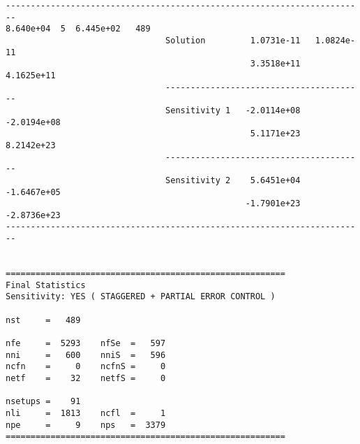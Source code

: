 \begin{verbatim}
------------------------------------------------------------------------
8.640e+04  5  6.445e+02   489
                                Solution         1.0731e-11   1.0824e-11 
                                                 3.3518e+11   4.1625e+11 
                                ----------------------------------------
                                Sensitivity 1   -2.0114e+08  -2.0194e+08 
                                                 5.1171e+23   8.2142e+23 
                                ----------------------------------------
                                Sensitivity 2    5.6451e+04  -1.6467e+05 
                                                -1.7901e+23  -2.8736e+23 
------------------------------------------------------------------------


========================================================
Final Statistics
Sensitivity: YES ( STAGGERED + PARTIAL ERROR CONTROL )

nst     =   489                

nfe     =  5293    nfSe  =   597  
nni     =   600    nniS  =   596  
ncfn    =     0    ncfnS =     0  
netf    =    32    netfS =     0

nsetups =    91                  
nli     =  1813    ncfl  =     1  
npe     =     9    nps   =  3379  
========================================================
\end{verbatim}